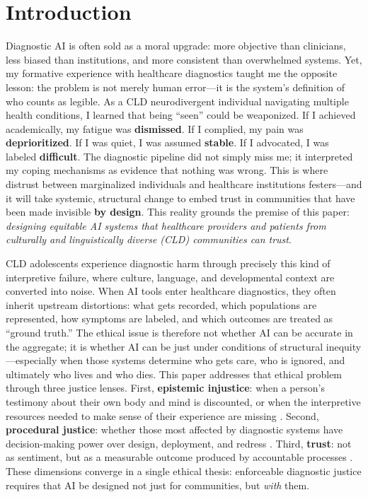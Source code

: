 \documentclass[12pt,a4paper]{article}
\begin{document}
\clearpage
\footnotesize\tableofcontents
\clearpage\normalsize




\section{Introduction}

Diagnostic AI is often sold as a moral upgrade: more objective than clinicians, less biased than institutions, and more consistent than overwhelmed systems. Yet, my formative experience with healthcare diagnostics taught me the opposite lesson: the problem is not merely human error—it is the system’s definition of who counts as legible. As a CLD neurodivergent individual navigating multiple health conditions, I learned that being “seen” could be weaponized. If I achieved academically, my fatigue was \textbf{dismissed}. If I complied, my pain was \textbf{deprioritized}. If I was quiet, I was assumed \textbf{stable}. If I advocated, I was labeled \textbf{difficult}. The diagnostic pipeline did not simply miss me; it interpreted my coping mechanisms as evidence that nothing was wrong. This is where distrust between marginalized individuals and healthcare institutions festers—and it will take systemic, structural change to embed trust in communities that have been made invisible \textbf{by design}. This reality grounds the premise of this paper: \textit{designing equitable AI systems that healthcare providers and patients from culturally and linguistically diverse (CLD) communities can trust}.

\vspace{0.5em}
CLD adolescents experience diagnostic harm through precisely this kind of interpretive failure, where culture, language, and developmental context are converted into noise. When AI tools enter healthcare diagnostics, they often inherit upstream distortions: what gets recorded, which populations are represented, how symptoms are labeled, and which outcomes are treated as ``ground truth.'' The ethical issue is therefore not whether AI can be accurate in the aggregate; it is whether AI can be just under conditions of structural inequity—especially when those systems determine who gets care, who is ignored, and ultimately who lives and who dies. This paper addresses that ethical problem through three justice lenses. First, \textbf{epistemic injustice}: when a person’s testimony about their own body and mind is discounted, or when the interpretive resources needed to make sense of their experience are missing \citep{Nadarzynski2024}. Second, \textbf{procedural justice}: whether those most affected by diagnostic systems have decision-making power over design, deployment, and redress \citep{Lekadir2025}. Third, \textbf{trust}: not as sentiment, but as a measurable outcome produced by accountable processes \citep{Sagona2025}. These dimensions converge in a single ethical thesis: enforceable diagnostic justice requires that AI be designed not just for communities, but \textit{with} them.
\end{document}
